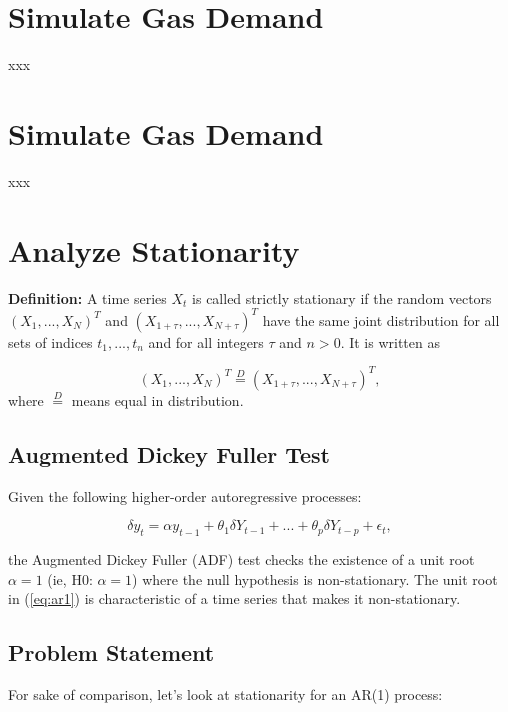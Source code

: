 \documentclass[peerreview]{ieeesyscoin}
\begin{document}
\section{Simulate Gas Demand}
\label{section:gas_demand}
xxx

\section{Simulate Gas Demand}
\label{section:gas_demand}
xxx

\section{Analyze Stationarity}
\label{section:analyze_stationarity}

\textbf{Definition:} A time series ${X_{t}}$ is called strictly stationary if the random vectors $(X_{1} , ... , X_{N} )^T$ and $(X_{1+\tau} , ... , X_{N+\tau} )^T$ have the same joint distribution for all sets of indices ${t_{1} , ... , t_{n}}$ and for all integers $\tau$ and $n > 0$. It is written as 

 \begin{equation}
(X_{1} , ... , X_{N} )^T \stackrel{D}{=} (X_{1+\tau} , ... , X_{N+\tau} )^T,
\label{eq:ar1} \tag{1}
\end{equation}
where $\stackrel{D}{=}$ means equal in distribution.

\subsection{Augmented Dickey Fuller Test}
\label{section:adf}

Given the following higher-order autoregressive processes:

\begin{equation}
\delta y_{t} = \alpha y_{t-1} + \theta_{1} \delta Y_{t-1}  + ... + \theta_{p} \delta Y_{t-p} + \epsilon_{t},
\label{eq:ar1} \tag{1}
\end{equation}

the Augmented Dickey Fuller (ADF) test checks the existence of a unit root $\alpha = 1$ (ie, H0: $\alpha = 1$) where the null hypothesis is non-stationary. The unit root in (\ref{eq:ar1}) is characteristic   of a time series that makes it non-stationary.

\subsection{Problem Statement}
\label{section:problem_statement}
For sake of comparison, let's look at stationarity for an AR(1) process: 
\end{document}
